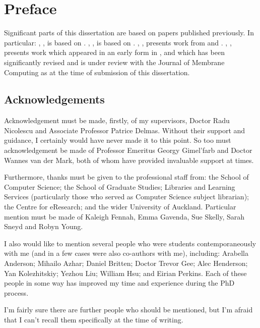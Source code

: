\chapter*{Preface}

Significant parts of this dissertation are based on papers published previously.  In particular: , , is based on \cite{Cooper2019}.  , , is based on \cite{Cooper2019a}.  , , presents work from \cite{Cooper2018} and \cite{Cooper2021}.  , , presents work which appeared in an early form in \cite{Cooper2020}, and which has been significantly revised and is under review with the Journal of Membrane Computing as at the time of submission of this dissertation.

\section*{Acknowledgements}

Acknowledgement must be made, firstly, of my supervisors, Doctor Radu Nicolescu and Associate Professor Patrice Delmas.  Without their support and guidance, I certainly would have never made it to this point.  So too must acknowledgement be made of Professor Emeritus Georgy Gimel'farb and Doctor Wannes van der Mark, both of whom have provided invaluable support at times.%

Furthermore, thanks must be given to the professional staff from: the School of Computer Science; the School of Graduate Studies; Libraries and Learning Services (particularly those who served as Computer Science subject librarian); the Centre for eResearch; and the wider University of Auckland.  Particular mention must be made of Kaleigh Fennah, Emma Gavenda, Sue Skelly, Sarah Sneyd and Robyn Young.

I also would like to mention several people who were students contemporaneously with me (and in a few cases were also co-authors with me), including: Arabella Anderson; Mihailo Azhar; Daniel Britten; Doctor Trevor Gee; Alec Henderson; Yan Kolezhitskiy; Yezhou Liu; William Hsu; and Eirian Perkins.  Each of these people in some way has improved my time and experience during the PhD process.

I'm fairly sure there are further people who should be mentioned, but I'm afraid that I can't recall them specifically at the time of writing.

